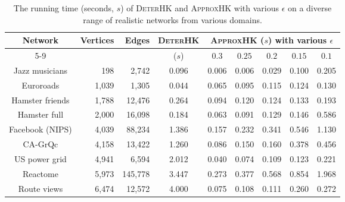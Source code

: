\documentclass[10pt,twocolumn,twoside]{IEEEtran}
\begin{document}
\begin{table}[htbp]
    \centering
    \normalsize
    \fontsize{8.0}{8.8}\selectfont
    \begin{threeparttable}
        \caption{The running time (seconds, \(s\)) of \textsc{DeterHK} and \textsc{ApproxHK} with various \(\epsilon\) on a diverse range of realistic networks from various domains.}
        \label{tab:runtime_comparison}
        \begin{tabular}{crrcccccc}
            \toprule
            \multirow{2}{*}{Network}          &
            \multirow{2}{*}{Vertices}         &
            \multirow{2}{*}{Edges}            &
            \multirow{2}{*}{\textsc{DeterHK}} &
            \multicolumn{5}{c}{\textsc{ApproxHK} (\(s\)) with various \(\epsilon\)}                                                 \\
            \cmidrule{5-9}                    &           &           & (\(s\)) & \(0.3\) & \(0.25\) & \(0.2\) & \(0.15\) & \(0.1\) \\
            \midrule
            Jazz musicians                    & 198       & 2,742     & 0.096   & 0.006   & 0.006    & 0.029   & 0.100    & 0.205   \\
            Euroroads                         & 1,039     & 1,305     & 0.044   & 0.065   & 0.095    & 0.115   & 0.124    & 0.130   \\
            Hamster friends                   & 1,788     & 12,476    & 0.264   & 0.094   & 0.120    & 0.124   & 0.133    & 0.193   \\
            Hamster full                      & 2,000     & 16,098    & 0.184   & 0.063   & 0.091    & 0.129   & 0.146    & 0.586   \\
            Facebook (NIPS)                   & 4,039     & 88,234    & 1.386   & 0.157   & 0.232    & 0.341   & 0.546    & 1.130   \\
            CA-GrQc                           & 4,158     & 13,422    & 1.260   & 0.086   & 0.150    & 0.160   & 0.378    & 0.456   \\
            US power grid                     & 4,941     & 6,594     & 2.012   & 0.040   & 0.074    & 0.109   & 0.123    & 0.221   \\
            Reactome                          & 5,973     & 145,778   & 3.447   & 0.273   & 0.377    & 0.568   & 0.854    & 1.968   \\
            Route views                       & 6,474     & 12,572    & 4.000   & 0.075   & 0.108    & 0.111   & 0.260    & 0.272   \\

\end{tabular}
\end{threeparttable}
\end{table}
\end{document}
